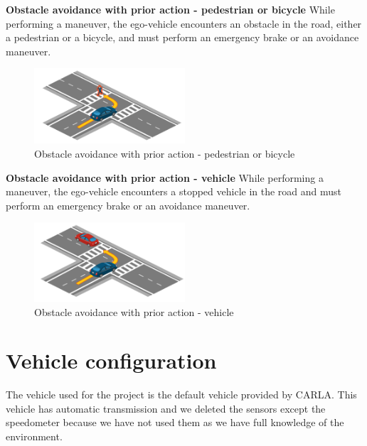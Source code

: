 \documentclass{article}
\begin{document}
\textbf{Obstacle avoidance with prior action - pedestrian or bicycle}
While performing a maneuver, the ego-vehicle encounters an obstacle in the road, either a pedestrian or a bicycle, and must perform an emergency brake
or an avoidance maneuver.
\begin{figure}[h]
    \centering
    \includegraphics[width=0.5\textwidth]{img/TR04.png}
    \caption{Obstacle avoidance with prior action - pedestrian or bicycle} \label{Scenario_obsAvoidanceWithPedBic}
\end{figure}

\textbf{Obstacle avoidance with prior action - vehicle}
While performing a maneuver, the ego-vehicle encounters a stopped vehicle in the road and must perform an emergency brake or an avoidance maneuver.
\begin{figure}[h]
    \centering
    \includegraphics[width=0.5\textwidth]{img/TR19a.png}
    \caption{Obstacle avoidance with prior action - vehicle} \label{Scenario_obsAvoidanceWithoutVehicle}
\end{figure}

\section{Vehicle configuration}
The vehicle used for the project is the default vehicle provided by CARLA.
This vehicle has automatic transmission and we deleted the sensors except the speedometer because we have not used them as we have full knowledge of the environment.
\end{document}
